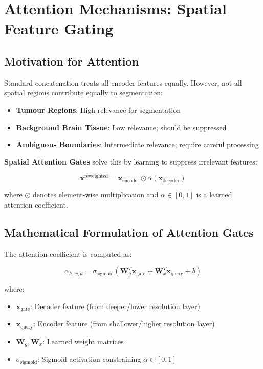\documentclass{ecsproject}     %
\begin{document}
\section{Attention Mechanisms: Spatial Feature Gating}

\subsection{Motivation for Attention}

Standard concatenation treats all encoder features equally. However, not all spatial regions contribute equally to segmentation:

\begin{itemize}
    \item \textbf{Tumour Regions}: High relevance for segmentation
    \item \textbf{Background Brain Tissue}: Low relevance; should be suppressed
    \item \textbf{Ambiguous Boundaries}: Intermediate relevance; require careful processing
\end{itemize}

\textbf{Spatial Attention Gates} solve this by learning to suppress irrelevant features:

\begin{equation}
\mathbf{x}^{\text{reweighted}} = \mathbf{x}_{\text{encoder}} \odot \alpha(\mathbf{x}_{\text{decoder}})
\label{Eq:AttentionMechanism}
\end{equation}

where $\odot$ denotes element-wise multiplication and $\alpha \in [0,1]$ is a learned attention coefficient.

\subsection{Mathematical Formulation of Attention Gates}

The attention coefficient is computed as:

\begin{equation}
\alpha_{h,w,d} = \sigma_{\text{sigmoid}}\left(\mathbf{W}_g^T \mathbf{x}_{\text{gate}} + \mathbf{W}_x^T \mathbf{x}_{\text{query}} + b\right)
\label{Eq:AttentionGate}
\end{equation}

where:
\begin{itemize}
    \item $\mathbf{x}_{\text{gate}}$: Decoder feature (from deeper/lower resolution layer)
    \item $\mathbf{x}_{\text{query}}$: Encoder feature (from shallower/higher resolution layer)
    \item $\mathbf{W}_g, \mathbf{W}_x$: Learned weight matrices
    \item $\sigma_{\text{sigmoid}}$: Sigmoid activation constraining $\alpha \in [0,1]$
\end{itemize}
\end{document}
